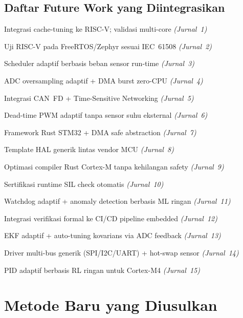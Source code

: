 \documentclass[12pt,a4paper]{article}
\begin{document}
\endgroup

\subsection{Daftar Future Work yang Diintegrasikan}

\begin{description}[leftmargin=2.2cm,style=nextline,
                    font=\bfseries\color{blue!70!black}]
\item[FW1]  Integrasi cache-tuning ke RISC-V; validasi multi-core \textit{(Jurnal~1)}
\item[FW2]  Uji RISC-V pada FreeRTOS/Zephyr sesuai IEC~61508 \textit{(Jurnal~2)}
\item[FW3]  Scheduler adaptif berbasis beban sensor run-time \textit{(Jurnal~3)}
\item[FW4]  ADC oversampling adaptif + DMA burst zero-CPU \textit{(Jurnal~4)}
\item[FW5]  Integrasi CAN~FD + Time-Sensitive Networking \textit{(Jurnal~5)}
\item[FW6]  Dead-time PWM adaptif tanpa sensor suhu eksternal \textit{(Jurnal~6)}
\item[FW7]  Framework Rust STM32 + DMA safe abstraction \textit{(Jurnal~7)}
\item[FW8]  Template HAL generik lintas vendor MCU \textit{(Jurnal~8)}
\item[FW9]  Optimasi compiler Rust Cortex-M tanpa kehilangan safety \textit{(Jurnal~9)}
\item[FW10] Sertifikasi runtime SIL check otomatis \textit{(Jurnal~10)}
\item[FW11] Watchdog adaptif + anomaly detection berbasis ML ringan \textit{(Jurnal~11)}
\item[FW12] Integrasi verifikasi formal ke CI/CD pipeline embedded \textit{(Jurnal~12)}
\item[FW13] EKF adaptif + auto-tuning kovarians via ADC feedback \textit{(Jurnal~13)}
\item[FW14] Driver multi-bus generik (SPI/I2C/UART) + hot-swap sensor \textit{(Jurnal~14)}
\item[FW15] PID adaptif berbasis RL ringan untuk Cortex-M4 \textit{(Jurnal~15)}
\end{description}

\newpage
\section{Metode Baru yang Diusulkan}
\label{sec:metode}
\end{document}
